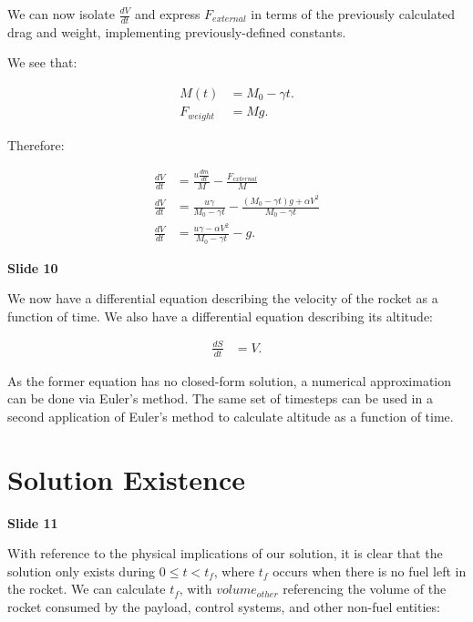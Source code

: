 \documentclass[]{article}
\begin{document}
We can now isolate $\frac{dV}{dt}$ and express $F_{external}$ in terms of the previously calculated drag and weight, implementing previously-defined constants.

We see that:

\begin{center}
	\begin{align*}
	M(t) &= M_0 - \gamma t . \\
	F_{weight} &= Mg .
	\end{align*}
\end{center}

Therefore:

\begin{center}
	\begin{align*}
	\frac{dV}{dt} &= \frac{u \frac{dm}{dt}}{M} - \frac{F_{external}}{M}  \\
	\frac{dV}{dt} &= \frac{u\gamma}{M_0 - \gamma t} - \frac{(M_0 - \gamma t)g + \alpha V^2}{M_0 - \gamma t} \\
	\frac{dV}{dt} &= \frac{u\gamma - \alpha V^2}{M_0 - \gamma t} - g .
	\end{align*}
\end{center}

\textbf{Slide 10}

We now have a differential equation describing the velocity of the rocket as a function of time. We also have a differential equation describing its altitude:

\begin{center}
	\begin{align*}
	\frac{dS}{dt} &= V .
	\end{align*}
\end{center}

As the former equation has no closed-form solution, a numerical approximation can be done via Euler's method. The same set of timesteps can be used in a second application of Euler's method to calculate altitude as a function of time.

\section{Solution Existence}

\textbf{Slide 11}

With reference to the physical implications of our solution, it is clear that the solution only exists during $0 \le t < t_{f}$, where $t_f$ occurs when there is no fuel left in the rocket. We can calculate $t_f$, with $volume_{other}$ referencing the volume of the rocket consumed by the payload, control systems, and other non-fuel entities:
\end{document}
